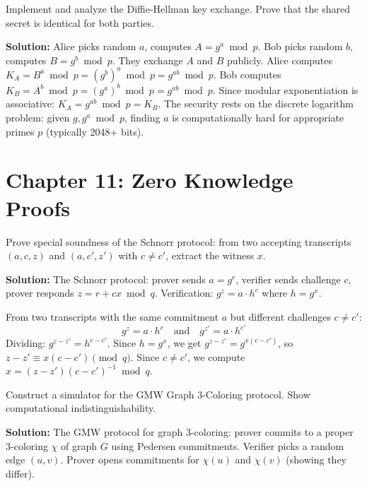 \begin{exercise}[Intermediate]
Implement and analyze the Diffie-Hellman key exchange. Prove that the shared secret is identical for both parties.
\end{exercise}
\textbf{Solution:} Alice picks random $a$, computes $A = g^a \bmod p$. Bob picks random $b$, computes $B = g^b \bmod p$. They exchange $A$ and $B$ publicly. Alice computes $K_A = B^a \bmod p = (g^b)^a \bmod p = g^{ab} \bmod p$. Bob computes $K_B = A^b \bmod p = (g^a)^b \bmod p = g^{ab} \bmod p$. Since modular exponentiation is associative: $K_A = g^{ab} \bmod p = K_B$. The security rests on the discrete logarithm problem: given $g, g^a \bmod p$, finding $a$ is computationally hard for appropriate primes $p$ (typically 2048+ bits).

\section{Chapter 11: Zero Knowledge Proofs}

\begin{exercise}[Basic]
Prove special soundness of the Schnorr protocol: from two accepting transcripts $(a,c,z)$ and $(a,c',z')$ with $c \neq c'$, extract the witness $x$.
\end{exercise}
\textbf{Solution:} The Schnorr protocol: prover sends $a = g^r$, verifier sends challenge $c$, prover responds $z = r + cx \bmod q$. Verification: $g^z = a \cdot h^c$ where $h = g^x$.

From two transcripts with the same commitment $a$ but different challenges $c \neq c'$:
\[
g^z = a \cdot h^c \quad \text{and} \quad g^{z'} = a \cdot h^{c'}
\]
Dividing: $g^{z - z'} = h^{c - c'}$. Since $h = g^x$, we get $g^{z-z'} = g^{x(c-c')}$, so $z - z' \equiv x(c - c') \pmod{q}$. Since $c \neq c'$, we compute $x = (z - z')(c - c')^{-1} \bmod q$.

\begin{exercise}[Intermediate]
Construct a simulator for the GMW Graph 3-Coloring protocol. Show computational indistinguishability.
\end{exercise}
\textbf{Solution:} The GMW protocol for graph 3-coloring: prover commits to a proper 3-coloring $\chi$ of graph $G$ using Pedersen commitments. Verifier picks a random edge $(u,v)$. Prover opens commitments for $\chi(u)$ and $\chi(v)$ (showing they differ).

